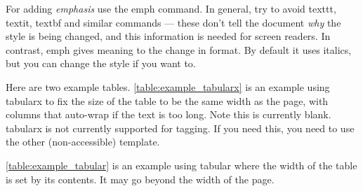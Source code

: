 \documentclass[times,12pt,thesis,online]{uom_thesis_casson} %
\newcommand{\otoprule}{\midrule[\heavyrulewidth]}
\begin{document}
    For adding \emph{emphasis} use the emph command. In general, try to avoid texttt, textit, textbf and similar commands --- these don't tell the document \emph{why} the style is being changed, and this information is needed for screen readers. In contrast, emph gives meaning to the change in format. By default it uses italics, but you can change the style if you want to. 
    
    Here are two example tables. \ref{table:example_tabularx} is an example using tabularx to fix the size of the table to be the same width as the page, with columns that auto-wrap if the text is too long. Note this is currently blank. tabularx is not currently supported for tagging. If you need this, you need to use the other (non-accessible) template.
    
    \ref{table:example_tabular} is an example using tabular where the width of the table is set by its contents. It may go beyond the width of the page.
    \begin{table}
      \centering
      \caption[Short caption for list of tables]{Example table. Full caption goes here. Often a short caption in [] is used as well as the main caption to keep the list of figures tidy; it gets messy if there are long captions going over more than one line.}
      \label{table:example_tabularx}
    \end{table}
\end{document}
